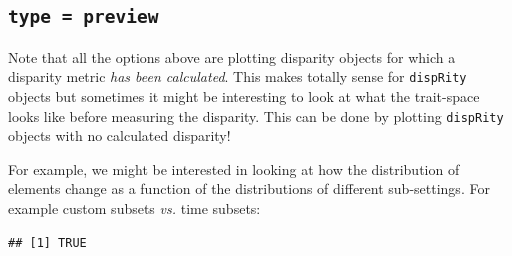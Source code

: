 \documentclass[]{book}
\newenvironment{Shaded}{\begin{snugshade}}{\end{snugshade}}
\newcommand{\CommentTok}[1]{\textcolor[rgb]{0.56,0.35,0.01}{\textit{#1}}}
\newcommand{\DataTypeTok}[1]{\textcolor[rgb]{0.13,0.29,0.53}{#1}}
\newcommand{\DecValTok}[1]{\textcolor[rgb]{0.00,0.00,0.81}{#1}}
\newcommand{\KeywordTok}[1]{\textcolor[rgb]{0.13,0.29,0.53}{\textbf{#1}}}
\newcommand{\NormalTok}[1]{#1}
\newcommand{\OperatorTok}[1]{\textcolor[rgb]{0.81,0.36,0.00}{\textbf{#1}}}
\newcommand{\OtherTok}[1]{\textcolor[rgb]{0.56,0.35,0.01}{#1}}
\newcommand{\StringTok}[1]{\textcolor[rgb]{0.31,0.60,0.02}{#1}}
\begin{document}
\hypertarget{type-preview}{%
\subsection{\texorpdfstring{\texttt{type\ =\ preview}}{type = preview}}\label{type-preview}}

Note that all the options above are plotting disparity objects for which a disparity metric \emph{has been calculated}.
This makes totally sense for \texttt{dispRity} objects but sometimes it might be interesting to look at what the trait-space looks like before measuring the disparity.
This can be done by plotting \texttt{dispRity} objects with no calculated disparity!

For example, we might be interested in looking at how the distribution of elements change as a function of the distributions of different sub-settings.
For example custom subsets \emph{vs.} time subsets:

\begin{Shaded}
\end{Shaded}

\begin{verbatim}
## [1] TRUE
\end{verbatim}

\begin{Shaded}
\end{Shaded}
\end{document}
